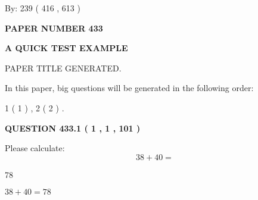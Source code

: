 \documentclass[12pt]{article}
\begin{document}
   
\hspace{1.0in} By: 
 239 ( 416 ,  613 )
   
   
   
   
\newpage 
\setcounter{page}{ 
   433001 } 
   
   
   
   
 {\textbf{ \Large{ PAPER NUMBER  433  }}}
   
   
\vspace{0.2in}
   
   
   
   
   
   
   
   
 \vspace{0.2in}
{\LARGE {\textbf{ A QUICK TEST EXAMPLE}}}
   
   
 PAPER TITLE GENERATED.
   
   
   
\vspace{0.2in}
   
In this paper, big questions will be generated in the following order: 
   
   
   1 ( 1 )
 ,
   2 ( 2 )
 .
  
\vspace{0.2in}
  
{\textbf{\Large{QUESTION
433.1 
 ( 1 , 1 , 101 )
}}}
  
  
 
Please calculate:
\begin{equation}
38 +  %
40 = \nonumber
\end{equation}
 
 
 
\noindent{}
 
 

78
 
 
\noindent{}
 
 

 
 
 
\noindent{}
 
 

$ %
38 +  %
40=   %
78$
 
 
\noindent{}
 
\end{document}
